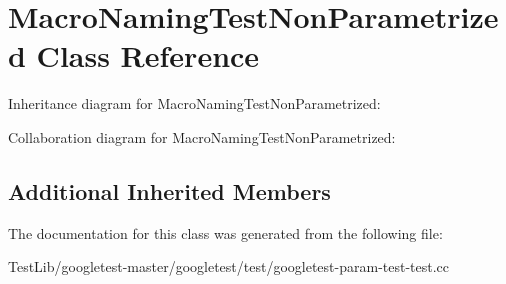 \hypertarget{classMacroNamingTestNonParametrized}{}\section{Macro\+Naming\+Test\+Non\+Parametrized Class Reference}
\label{classMacroNamingTestNonParametrized}


Inheritance diagram for Macro\+Naming\+Test\+Non\+Parametrized\+:


Collaboration diagram for Macro\+Naming\+Test\+Non\+Parametrized\+:
\subsection*{Additional Inherited Members}


The documentation for this class was generated from the following file\+:\begin{DoxyCompactItemize}
\item 
Test\+Lib/googletest-\/master/googletest/test/googletest-\/param-\/test-\/test.\+cc\end{DoxyCompactItemize}
